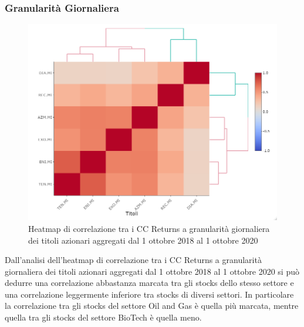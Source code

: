 \documentclass[12pt]{article}
\begin{document}
\subsubsection{Granularità Giornaliera}
\begin{figure}[!htb]
    \centering
    \includegraphics[width=1\textwidth]{immagini/corrdaily.png}
    \caption{Heatmap di correlazione tra i CC Returns a granularità giornaliera dei titoli azionari aggregati dal 1 ottobre 2018 al 1 ottobre 2020}
\end{figure}
\FloatBarrier
Dall'analisi dell'heatmap di correlazione tra i CC Returns a granularità giornaliera dei titoli azionari aggregati dal 1 ottobre 2018 al 1 ottobre 2020 si può dedurre una correlazione abbastanza marcata tra gli stocks dello stesso settore e una correlazione leggermente inferiore tra stocks di diversi settori. In particolare la correlazione tra gli stocks del settore Oil and Gas è quella più marcata, mentre quella tra gli stocks del settore BioTech è quella meno.
\newpage
\end{document}
